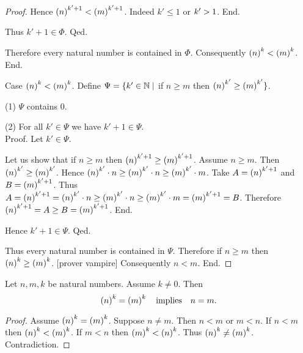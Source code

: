 \documentclass[../arithmetic.tex]{subfiles}
\begin{document}
\begin{forthel}
\begin{proof}
            Hence $\left(n\right)^{k' + 1} < \left(m\right)^{k' + 1}$.
            Indeed $k' \leq 1$ or $k' > 1$.
          End.

          Thus $k' \plus 1 \in \Phi$.
        Qed.

        Therefore every natural number is contained in $\Phi$.
        Consequently $\left(n\right)^{k} < \left(m\right)^{k}$.
      End.

      Case $\left(n\right)^{k} < \left(m\right)^{k}$.
        Define $\Psi = \{ k' \in \mathbb{N} \mid$ if $n \geq m$ then
        $\left(n\right)^{k'} \geq \left(m\right)^{k'} \}$.

        (1) $\Psi$ contains $0$.

        (2) For all $k' \in \Psi$ we have $k' \plus 1 \in \Psi$. \\
        Proof.
          Let $k' \in \Psi$.

          Let us show that if $n \geq m$ then $\left(n\right)^{k' + 1} \geq \left(m\right)^{k' + 1}$.
            Assume $n \geq m$.
            Then $\left(n\right)^{k'} \geq \left(m\right)^{k'}$.
            Hence $\left(n\right)^{k'} \cdot n \geq \left(m\right)^{k'} \cdot n \geq \left(m\right)^{k'} \cdot m$.
            Take $A = \left(n\right)^{k' + 1}$ and $B = \left(m\right)^{k' + 1}$. %
            Thus $A
              = \left(n\right)^{k' + 1}
              = \left(n\right)^{k'} \cdot n
              \geq \left(m\right)^{k'} \cdot n
              \geq \left(m\right)^{k'} \cdot m
              = \left(m\right)^{k' + 1}
              = B$.
            Therefore $\left(n\right)^{k' + 1} = A \geq B = \left(m\right)^{k' + 1}$.
          End.

          Hence $k' \plus 1 \in \Psi$.
        Qed.

        Thus every natural number is contained in $\Psi$.
        Therefore if $n \geq m$ then $\left(n\right)^{k} \geq \left(m\right)^{k}$.
        [prover vampire]
        Consequently $n \less m$.
      End.
    \end{proof}
  \end{forthel}

  \begin{forthel}
    \begin{corollary}
      Let $n, m, k$ be natural numbers.
      Assume $k \neq 0$.
      Then \[ \left(n\right)^{k} = \left(m\right)^{k} \quad \text{implies} \quad n = m. \]
    \end{corollary}
    \begin{proof}
      Assume $\left(n\right)^{k} = \left(m\right)^{k}$.
      Suppose $n \neq m$.
      Then $n \less m$ or $m \less n$.
      If $n \less m$ then $\left(n\right)^{k} < \left(m\right)^{k}$.
      If $m \less n$ then $\left(m\right)^{k} < \left(n\right)^{k}$.
      Thus $\left(n\right)^{k} \neq \left(m\right)^{k}$.
      Contradiction.
    \end{proof}
  \end{forthel}
\end{document}
